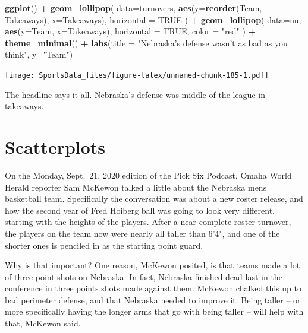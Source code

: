 \documentclass[
]{book}
\newenvironment{Shaded}{\begin{snugshade}}{\end{snugshade}}
\newcommand{\DataTypeTok}[1]{\textcolor[rgb]{0.13,0.29,0.53}{#1}}
\newcommand{\KeywordTok}[1]{\textcolor[rgb]{0.13,0.29,0.53}{\textbf{#1}}}
\newcommand{\NormalTok}[1]{#1}
\newcommand{\OperatorTok}[1]{\textcolor[rgb]{0.81,0.36,0.00}{\textbf{#1}}}
\newcommand{\OtherTok}[1]{\textcolor[rgb]{0.56,0.35,0.01}{#1}}
\newcommand{\StringTok}[1]{\textcolor[rgb]{0.31,0.60,0.02}{#1}}
\begin{document}
\begin{Shaded}
\begin{Highlighting}[]
\KeywordTok{ggplot}\NormalTok{() }\OperatorTok{+}\StringTok{ }
\StringTok{  }\KeywordTok{geom_lollipop}\NormalTok{(}
    \DataTypeTok{data=}\NormalTok{turnovers, }
    \KeywordTok{aes}\NormalTok{(}\DataTypeTok{y=}\KeywordTok{reorder}\NormalTok{(Team, Takeaways), }\DataTypeTok{x=}\NormalTok{Takeaways), }
    \DataTypeTok{horizontal =} \OtherTok{TRUE}
\NormalTok{    ) }\OperatorTok{+}\StringTok{ }
\StringTok{  }\KeywordTok{geom_lollipop}\NormalTok{(}
    \DataTypeTok{data=}\NormalTok{nu,}
    \KeywordTok{aes}\NormalTok{(}\DataTypeTok{y=}\NormalTok{Team, }\DataTypeTok{x=}\NormalTok{Takeaways),}
    \DataTypeTok{horizontal =} \OtherTok{TRUE}\NormalTok{,}
    \DataTypeTok{color =} \StringTok{"red"}
\NormalTok{  ) }\OperatorTok{+}\StringTok{ }
\StringTok{  }\KeywordTok{theme_minimal}\NormalTok{() }\OperatorTok{+}\StringTok{ }
\StringTok{  }\KeywordTok{labs}\NormalTok{(}\DataTypeTok{title =} \StringTok{"Nebraska's defense wasn't as bad as you think"}\NormalTok{, }\DataTypeTok{y=}\StringTok{"Team"}\NormalTok{)}
\end{Highlighting}
\end{Shaded}

\texttt{[image: SportsData\_files/figure-latex/unnamed-chunk-185-1.pdf]}

The headline says it all. Nebraska's defense was middle of the league in takeaways.

\hypertarget{scatterplots}{%
\chapter{Scatterplots}\label{scatterplots}}

On the Monday, Sept.~21, 2020 edition of the Pick Six Podcast, Omaha World Herald reporter Sam McKewon talked a little about the Nebraska mens basketball team. Specifically the conversation was about a new roster release, and how the second year of Fred Hoiberg ball was going to look very different, starting with the heights of the players. After a near complete roster turnover, the players on the team now were nearly all taller than 6'4", and one of the shorter ones is penciled in as the starting point guard.

Why is that important? One reason, McKewon posited, is that teams made a lot of three point shots on Nebraska. In fact, Nebraska finished dead last in the conference in three points shots made against them. McKewon chalked this up to bad perimeter defense, and that Nebraska needed to improve it. Being taller -- or more specifically having the longer arms that go with being taller -- will help with that, McKewon said.
\end{document}
